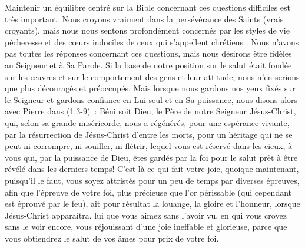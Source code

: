 \begin{enumerate}
\begin{specialpar}{}
Maintenir un équilibre centré sur la Bible concernant ces questions difficiles est très important.
 Nous croyons vraiment dans la persévérance des Saints (vrais croyants),
 mais nous nous sentons profondément concernés par les styles de vie pécheresse et des cœurs indociles
 de ceux qui s'appellent \og chrétiens \fg{}.
 Nous n'avons pas toutes les réponses concernant ces questions,
 mais nous désirons être fidèles au Seigneur et à Sa Parole.
 Si la base de notre position sur le salut était fondée sur les œuvres
 et sur le comportement des gens et leur attitude,
 nous n'en serions que plus découragés et préoccupés.
 Mais lorsque nous gardons nos yeux fixés sur le Seigneur et gardons confiance en Lui seul
 et en Sa puissance, nous disons alors avec Pierre dans
 \BRallowhypbch{}(1:3-9)\BRforbidhypbch~:
 \og Béni soit Dieu, le Père de notre Seigneur Jésus-Christ, qui, selon sa grande miséricorde,
 nous a régénérés, pour une espérance vivante, par la résurrection de Jésus-Christ d'entre les morts,
 pour un héritage qui ne se peut ni corrompre, ni souiller, ni flétrir,
 lequel vous est réservé dans les cieux, à vous qui, par la puissance de Dieu,
 êtes gardés par la foi pour le salut prêt à être révélé dans les derniers temps!
 C'est là ce qui fait votre joie, quoique maintenant, puisqu'il le faut,
 vous soyez attristés pour un peu de temps par diverses épreuves, afin que l'épreuve de votre foi,
 plus précieuse que l'or périssable (qui cependant est éprouvé par le feu),
 ait pour résultat la louange, la gloire et l'honneur, lorsque Jésus-Christ apparaîtra,
 lui que vous aimez sans l'avoir vu, en qui vous croyez sans le voir encore,
 vous réjouissant d'une joie ineffable et glorieuse,
 parce que vous obtiendrez le salut de vos âmes pour prix de votre foi. \fg{}
\end{specialpar}


\end{enumerate}

